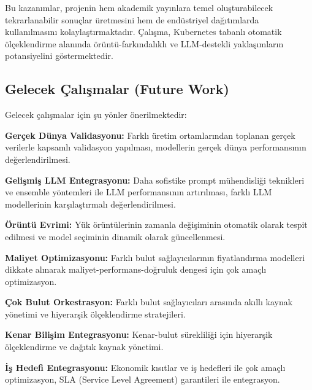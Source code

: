 Bu kazanımlar, projenin hem akademik yayınlara temel oluşturabilecek tekrarlanabilir sonuçlar üretmesini hem de endüstriyel dağıtımlarda kullanılmasını kolaylaştırmaktadır. Çalışma, Kubernetes tabanlı otomatik ölçeklendirme alanında örüntü-farkındalıklı ve LLM-destekli yaklaşımların potansiyelini göstermektedir.

\subsection{Gelecek Çalışmalar (Future Work)}

Gelecek çalışmalar için şu yönler önerilmektedir:

\textbf{Gerçek Dünya Validasyonu:} Farklı üretim ortamlarından toplanan gerçek verilerle kapsamlı validasyon yapılması, modellerin gerçek dünya performansının değerlendirilmesi.

\textbf{Gelişmiş LLM Entegrasyonu:} Daha sofistike prompt mühendisliği teknikleri ve ensemble yöntemleri ile LLM performansının artırılması, farklı LLM modellerinin karşılaştırmalı değerlendirilmesi.

\textbf{Örüntü Evrimi:} Yük örüntülerinin zamanla değişiminin otomatik olarak tespit edilmesi ve model seçiminin dinamik olarak güncellenmesi.

\textbf{Maliyet Optimizasyonu:} Farklı bulut sağlayıcılarının fiyatlandırma modelleri dikkate alınarak maliyet-performans-doğruluk dengesi için çok amaçlı optimizasyon.

\textbf{Çok Bulut Orkestrasyon:} Farklı bulut sağlayıcıları arasında akıllı kaynak yönetimi ve hiyerarşik ölçeklendirme stratejileri.

\textbf{Kenar Bilişim Entegrasyonu:} Kenar-bulut sürekliliği için hiyerarşik ölçeklendirme ve dağıtık kaynak yönetimi.

\textbf{İş Hedefi Entegrasyonu:} Ekonomik kısıtlar ve iş hedefleri ile çok amaçlı optimizasyon, SLA (Service Level Agreement) garantileri ile entegrasyon.

